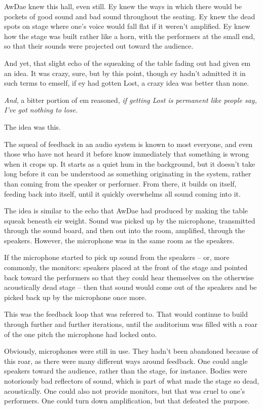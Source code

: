 AwDae knew this hall, even still. Ey knew the ways in which there would be pockets of good sound and bad sound throughout the seating. Ey knew the dead spots on stage where one's voice would fall flat if it weren't amplified. Ey knew how the stage was built rather like a horn, with the performers at the small end, so that their sounds were projected out toward the audience.

And yet, that slight echo of the squeaking of the table fading out had given em an idea. It was crazy, sure, but by this point, though ey hadn't admitted it in such terms to emself, if ey had gotten Lost, a crazy idea was better than none.

\textit{And}, a bitter portion of em reasoned, \textit{if getting Lost \emph{is} permanent like people say, I've got nothing to lose.}

The idea was this.

The squeal of feedback in an audio system is known to most everyone, and even those who have not heard it before know immediately that something is wrong when it crops up. It starts as a quiet hum in the background, but it doesn't take long before it can be understood as something originating in the system, rather than coming from the speaker or performer. From there, it builds on itself, feeding back into itself, until it quickly overwhelms all sound coming into it.

The idea is similar to the echo that AwDae had produced by making the table squeak beneath eir weight. Sound was picked up by the microphone, transmitted through the sound board, and then out into the room, amplified, through the speakers. However, the microphone was in the same room as the speakers.

If the microphone started to pick up sound from the speakers -- or, more commonly, the monitors: speakers placed at the front of the stage and pointed back toward the performers so that they could hear themselves on the otherwise acoustically dead stage -- then that sound would come out of the speakers and be picked back up by the microphone once more.

This was the feedback loop that was referred to. That would continue to build through further and further iterations, until the auditorium was filled with a roar of the one pitch the microphone had locked onto.

Obviously, microphones were still in use. They hadn't been abandoned because of this roar, as there were many different ways around feedback. One could angle speakers toward the audience, rather than the stage, for instance. Bodies were notoriously bad reflectors of sound, which is part of what made the stage so dead, acoustically. One could also not provide monitors, but that was cruel to one's performers. One could turn down amplification, but that defeated the purpose.

